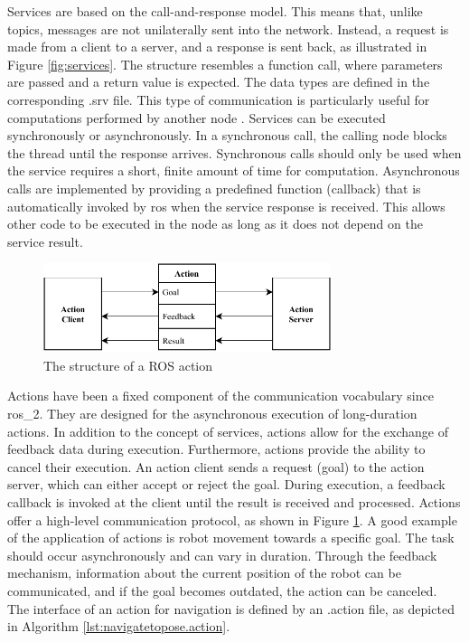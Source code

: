 Services are based on the call-and-response model. This means that, unlike topics, messages are not unilaterally sent into the network. Instead, a request is made from a client to a server, and a response is sent back, as illustrated in Figure \ref{fig:services}. The structure resembles a function call, where parameters are passed and a return value is expected. The data types are defined in the corresponding .srv file. This type of communication is particularly useful for computations performed by another node \cite[p. 51]{quigley_programming_2015}. Services can be executed synchronously or asynchronously. In a synchronous call, the calling node blocks the thread until the response arrives. Synchronous calls should only be used when the service requires a short, finite amount of time for computation. Asynchronous calls are implemented by providing a predefined function (callback) that is automatically invoked by \gls{ros} when the service response is received. This allows other code to be executed in the node as long as it does not depend on the service result.

\begin{figure}[h]
    \centering
    \includegraphics[width=0.75\textwidth]{figures/20_state_of_the_art/actions.pdf}
    \caption{The structure of a ROS action}
    \label{fig:actions}
\end{figure}

Actions have been a fixed component of the communication vocabulary since \gls{ros_2}. They are designed for the asynchronous execution of long-duration actions. In addition to the concept of services, actions allow for the exchange of feedback data during execution. Furthermore, actions provide the ability to cancel their execution. An action client sends a request (goal) to the action server, which can either accept or reject the goal. During execution, a feedback callback is invoked at the client until the result is received and processed. Actions offer a high-level communication protocol, as shown in Figure \ref{fig:actions}. A good example of the application of actions is robot movement towards a specific goal. The task should occur asynchronously and can vary in duration. Through the feedback mechanism, information about the current position of the robot can be communicated, and if the goal becomes outdated, the action can be canceled. The interface of an action for navigation is defined by an .action file, as depicted in Algorithm \ref{lst:navigatetopose.action}.

